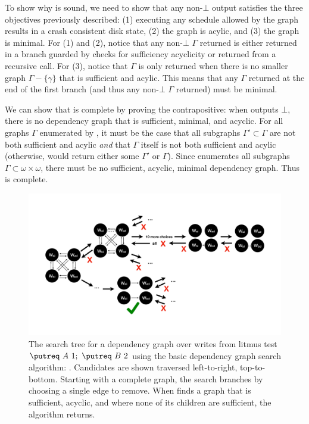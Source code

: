 To show why \graphsearch is sound, we need to show that any non-$\bot$ output satisfies the three
objectives previously described: (1) executing any schedule allowed by the graph results in a crash
consistent disk state, (2) the graph is acylic, and (3) the graph is minimal. For (1) and (2), notice
that any non-$\bot$ $\Gamma$ returned is either returned in a branch guarded by checks
for sufficiency acyclicity or returned from a recursive call. For (3), notice that $\Gamma$ is only returned
when there is no smaller graph $\Gamma - \{\gamma\}$ that is sufficient and acylic.
This means that any $\Gamma$ returned at the end of the first branch (and thus any non-$\bot$ $\Gamma$ returned)
must be minimal.

We can show that \graphsearch is complete by proving the contrapositive: when \graphsearch outputs $\bot$,
there is no dependency graph that is sufficient, minimal, and acyclic. For all graphs $\Gamma$ enumerated
by \graphsearch, it must be the case that all subgraphs $\Gamma'\subset\Gamma$
are not both sufficient and acylic \textit{and} that $\Gamma$ itself is not both sufficient and acylic
(otherwise, \graphsearch would return either some $\Gamma'$ or $\Gamma$). Since \graphsearch enumerates
all subgraphs $\Gamma\subset\omega\times\omega$, there must be no sufficient, acyclic, minimal dependency graph.
Thus \graphsearch is complete.

\begin{figure}
  \centering
  \includegraphics[clip,trim=0cm 5cm 0cm 5cm,width=0.9\linewidth,page=1]{graph-search-graphics.pdf}
  \caption{The search tree for a dependency graph over writes from litmus test
           $ \putreq\ A\ 1;\ \putreq\ B\ 2$ using
           the basic dependency graph search algorithm: \graphsearch.
           Candidates are shown traversed left-to-right, top-to-bottom.
           Starting with a complete graph, the search branches by choosing a single edge to remove.
           When \graphsearch finds a graph that is sufficient, acyclic, and where none of its children
           are sufficient, the algorithm returns.\tighten}
  \label{fig:basic-search-visual}
\end{figure}

